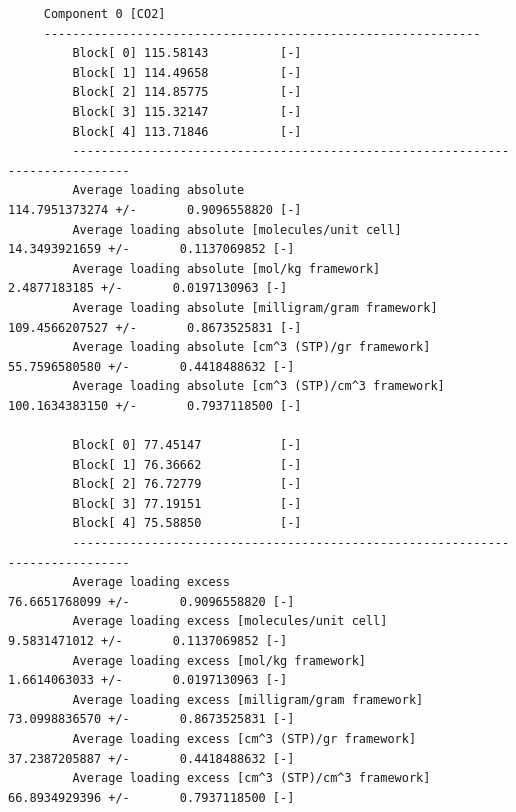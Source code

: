 \begin{tiny}
\begin{verbatim}
     Component 0 [CO2]
     -------------------------------------------------------------
         Block[ 0] 115.58143          [-]
         Block[ 1] 114.49658          [-]
         Block[ 2] 114.85775          [-]
         Block[ 3] 115.32147          [-]
         Block[ 4] 113.71846          [-]
         ------------------------------------------------------------------------------
         Average loading absolute                            114.7951373274 +/-       0.9096558820 [-]
         Average loading absolute [molecules/unit cell]       14.3493921659 +/-       0.1137069852 [-]
         Average loading absolute [mol/kg framework]                  2.4877183185 +/-       0.0197130963 [-]
         Average loading absolute [milligram/gram framework]        109.4566207527 +/-       0.8673525831 [-]
         Average loading absolute [cm^3 (STP)/gr framework]          55.7596580580 +/-       0.4418488632 [-]
         Average loading absolute [cm^3 (STP)/cm^3 framework]       100.1634383150 +/-       0.7937118500 [-]
     
         Block[ 0] 77.45147           [-]
         Block[ 1] 76.36662           [-]
         Block[ 2] 76.72779           [-]
         Block[ 3] 77.19151           [-]
         Block[ 4] 75.58850           [-]
         ------------------------------------------------------------------------------
         Average loading excess                             76.6651768099 +/-       0.9096558820 [-]
         Average loading excess [molecules/unit cell]        9.5831471012 +/-       0.1137069852 [-]
         Average loading excess [mol/kg framework]                    1.6614063033 +/-       0.0197130963 [-]
         Average loading excess [milligram/gram framework]           73.0998836570 +/-       0.8673525831 [-]
         Average loading excess [cm^3 (STP)/gr framework]            37.2387205887 +/-       0.4418488632 [-]
         Average loading excess [cm^3 (STP)/cm^3 framework]          66.8934929396 +/-       0.7937118500 [-]
\end{verbatim}
\end{tiny}

